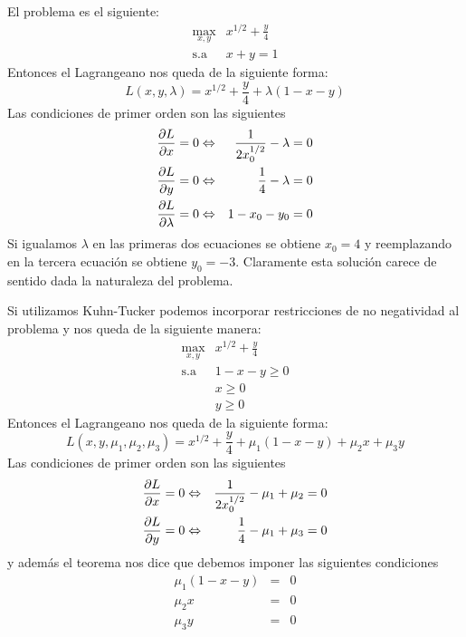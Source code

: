 \begin{solucion}
El problema es el siguiente:
\begin{equation*}
	\begin{array}{cl}
	\displaystyle \max_{x,y} & x^{1/2}+\displaystyle \frac{y}{4} \\
	\text{s.a}				 	 & x+y=1 
	\end{array}
\end{equation*}
Entonces el Lagrangeano nos queda de la siguiente forma:
$$L(x,y,\lambda)=x^{1/2}+\displaystyle \frac{y}{4} + \lambda (1 - x - y)$$
Las condiciones de primer orden son las siguientes
\begin{eqnarray*}
\frac{\partial L}{\partial x} 		 = 0 &\Leftrightarrow& \frac{1}{2x_{0}^{1/2}} - \lambda = 0 \\
\frac{\partial L}{\partial y}	 	 = 0 &\Leftrightarrow& \frac{1}{4} - \lambda = 0 \\
\frac{\partial L}{\partial \lambda} = 0 &\Leftrightarrow& 1 - x_{0} - y_{0} = 0
\end{eqnarray*}
Si igualamos $\lambda$ en las primeras dos ecuaciones se obtiene $x_0= 4$ y reemplazando en la tercera ecuaci\'on se obtiene $y_0 = -3$. Claramente esta soluci\'on carece de sentido dada la naturaleza del problema.

Si utilizamos Kuhn-Tucker podemos incorporar restricciones de no negatividad al problema y nos queda de la siguiente manera:
\begin{equation*}
	\begin{array}{cl}
	\displaystyle \max_{x,y} & x^{1/2}+\displaystyle \frac{y}{4} \\
	\text{s.a}	& 1-x-y \geq 0 \\
				& x\geq 0 \\
				& y\geq 0 
	\end{array}
\end{equation*}
Entonces el Lagrangeano nos queda de la siguiente forma:
$$L(x,y,\mu_1,\mu_2,\mu_3)=x^{1/2}+\displaystyle \frac{y}{4} + \mu_1 (1 - x - y) + \mu_2 x + \mu_3 y$$
Las condiciones de primer orden son las siguientes
\begin{eqnarray*}
\frac{\partial L}{\partial x} 		 = 0 &\Leftrightarrow& \frac{1}{2x_{0}^{1/2}} - \mu_1 + \mu_2 = 0 \\
\frac{\partial L}{\partial y}	 	 = 0 &\Leftrightarrow& \frac{1}{4} - \mu_1 + \mu_3 = 0 
\end{eqnarray*}
y adem\'as el teorema nos dice que debemos imponer las siguientes condiciones 
\begin{eqnarray*}
\mu_1 (1-x-y) &=& 0 \\
\mu_2 x &=& 0 \\
\mu_3 y &=& 0
\end{eqnarray*}


\end{solucion}
